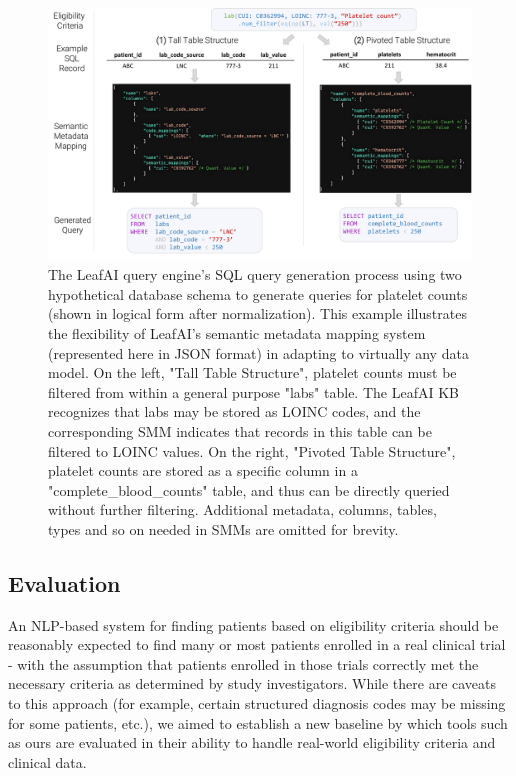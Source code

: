 \documentclass[../main.tex]{subfiles}
\begin{document}
\begin{figure}[h]
  \includegraphics[scale=0.47]{figures/leafai_smm.pdf}  
\caption{The LeafAI query engine's SQL query generation process using two hypothetical database schema to generate queries for platelet counts (shown in logical form after normalization). This example illustrates the flexibility of LeafAI's semantic metadata mapping system (represented here in JSON format) in adapting to virtually any data model. On the left, "Tall Table Structure", platelet counts must be filtered from within a general purpose "labs" table. The LeafAI KB recognizes that labs may be stored as LOINC codes, and the corresponding SMM indicates that records in this table can be filtered to LOINC values. On the right, "Pivoted Table Structure", platelet counts are stored as a specific column in a "complete\_blood\_counts" table, and thus can be directly queried without further filtering. Additional metadata, columns, tables, types and so on needed in SMMs are omitted for brevity.}
\label{fig_leafai_smm}
\end{figure}

\subsection*{Evaluation}

An NLP-based system for finding patients based on eligibility criteria should be reasonably expected to find many or most patients enrolled in a real clinical trial - with the assumption that patients enrolled in those trials correctly met the necessary criteria as determined by study investigators. While there are caveats to this approach (for example, certain structured diagnosis codes may be missing for some patients, etc.), we aimed to establish a new baseline by which tools such as ours are evaluated in their ability to handle real-world eligibility criteria and clinical data.
\end{document}
